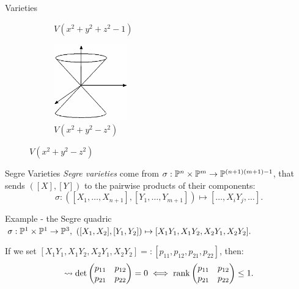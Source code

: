 \begin{frame}{Varieties}
\begin{figure}
\begin{subfigure}[b]{0.475\textwidth}
            \caption[]%
            {{\small $V(x^{2} + y^{2} + z^{2} - 1)$}}    
        \end{subfigure}
        \hfill
        \begin{subfigure}[b]{0.475\textwidth}   
            \centering 
            \includegraphics[width=0.35\textwidth]{resources/cone}
            \caption[]%
            {{\small $V(x^{2} + y^{2} - z^{2})$}}    
        \end{subfigure}
    \end{figure}

\end{frame}

\begin{frame}{Segre Varieties}
        \emph{Segre varieties} come from $\sigma: \mathbb{P}^{n} \times \mathbb{P}^{m} \rightarrow \mathbb{P}^{(n+1)(m+1) - 1}$, that sends $([X],[Y])$ to the pairwise products of their components:
            $$ \sigma : ([X_{1}, \ldots, X_{n+1}], [Y_{1}, \ldots, Y_{m+1}]) \mapsto [\ldots, X_{i}Y_{j}, \ldots ]. $$

        \begin{block}{Example - the Segre quadric}
        $\sigma : \PP^{1} \times \PP^{1} \ra \PP^{3},\ ([X_{1}, X_{2}], [Y_{1}, Y_{2}]) \mapsto [ X_{1}Y_{1}, X_{1}Y_{2}, X_{2}Y_{1}, X_{2}Y_{2} ]. $
        
        If we set $[ X_{1}Y_{1}, X_{1}Y_{2}, X_{2}Y_{1}, X_{2}Y_{2} ] =: [p_{11}, p_{12}, p_{21}, p_{22}]$, then:
        $$ \rightsquigarrow \det \begin{pmatrix} p_{11} & p_{12} \\ p_{21} & p_{22} \end{pmatrix} = 0 \iff \rank \begin{pmatrix} p_{11} & p_{12} \\ p_{21} & p_{22} \end{pmatrix} \leq 1. $$
        \end{block}
\end{frame}

